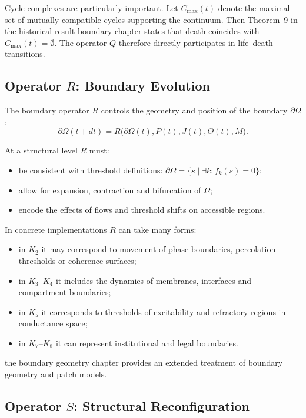 Cycle complexes are particularly important. Let \(C_{\max}(t)\) denote the
maximal set of mutually compatible cycles supporting the continuum. Then
Theorem~9 in the historical result-boundary chapter states that death coincides with
\(C_{\max}(t) = \emptyset\). The operator \(Q\) therefore directly participates
in life–death transitions.

\subsection{Operator \texorpdfstring{\texorpdfstring{$R$}{R}}{R}: Boundary Evolution}

The boundary operator \(R\) controls the geometry and position of the boundary
\(\partial\Omega\):
\[
  \partial\Omega(t+dt) =
    R\big(\partial\Omega(t), P(t), J(t), \Theta(t), M\big).
\]

At a structural level \(R\) must:
\begin{itemize}
  \item be consistent with threshold definitions:
        \(\partial\Omega = \{ s \mid \exists k: f_k(s) = 0 \}\);
  \item allow for expansion, contraction and bifurcation of \(\Omega\);
  \item encode the effects of flows and threshold shifts on accessible regions.
\end{itemize}

In concrete implementations \(R\) can take many forms:
\begin{itemize}
  \item in \(K_2\) it may correspond to movement of phase boundaries,
        percolation thresholds or coherence surfaces;
  \item in \(K_3\)–\(K_4\) it includes the dynamics of membranes, interfaces
        and compartment boundaries;
  \item in \(K_5\) it corresponds to thresholds of excitability and refractory
        regions in conductance space;
  \item in \(K_7\)–\(K_8\) it can represent institutional and legal
        boundaries.
\end{itemize}

the boundary geometry chapter provides an extended treatment of boundary
geometry and patch models.

\subsection{Operator \texorpdfstring{\texorpdfstring{$S$}{S}}{S}: Structural Reconfiguration}

